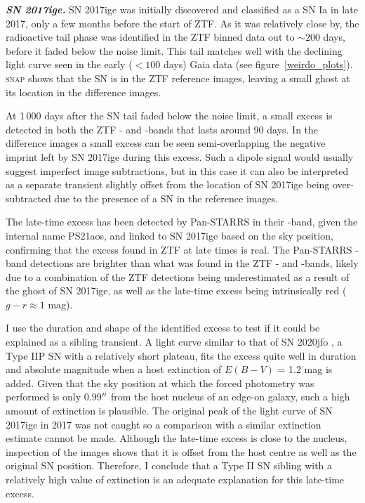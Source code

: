 \documentclass[a4paper,oneside,12pt, class=Latex/Classes/PhDthesisPSnPDF, crop=false]{standalone}
\begin{document}
\textit{\textbf{SN 2017ige.}}
SN 2017ige was initially discovered and classified as a SN Ia in late 2017, only a few months before the start of ZTF. As it was relatively close by, the radioactive tail phase was identified in the ZTF binned data out to $\sim200$ days, before it faded below the noise limit. This tail matches well with the declining light curve seen in the early ($<100$ days) Gaia data (see figure~\ref{weirdo_plots}). \textsc{snap} shows that the SN is in the ZTF reference images, leaving a small ghost at its location in the difference images.

At 1\,000 days after the SN tail faded below the noise limit, a small excess is detected in both the ZTF \ztfg- and \ztfr-bands that lasts around 90 days. In the difference images a small excess can be seen semi-overlapping the negative imprint left by SN 2017ige during this excess. Such a dipole signal would usually suggest imperfect image subtractions, but in this case it can also be interpreted as a separate transient slightly offset from the location of SN 2017ige being over-subtracted due to the presence of a SN in the reference images.

The late-time excess has been detected by Pan-STARRS in their \ztfi-band, given the internal name PS21aos, and linked to SN 2017ige based on the sky position, confirming that the excess found in ZTF at late times is real. The Pan-STARRS \ztfi-band detections are brighter than what was found in the ZTF \ztfg- and \ztfr-bands, likely due to a combination of the ZTF detections being underestimated as a result of the ghost of SN 2017ige, as well as the late-time excess being intrinsically red ($g - r \approx 1$ mag).

I use the duration and shape of the identified excess to test if it could be explained as a sibling transient. A light curve similar to that of SN 2020jfo \citep{Sollerman_2020jfo, IIp_ext}, a Type IIP SN with a relatively short plateau, fits the excess quite well in duration and absolute magnitude when a host extinction of $ E(B - V)$ = 1.2 mag is added. Given that the sky position at which the forced photometry was performed is only 0.99$^{\prime\prime}$ from the host nucleus of an edge-on galaxy, such a high amount of extinction is plausible. The original peak of the light curve of SN 2017ige in 2017 was not caught so a comparison with a similar extinction estimate cannot be made. Although the late-time excess is close to the nucleus, inspection of the images shows that it is offset from the host centre as well as the original SN position. Therefore, I conclude that a Type II SN sibling with a relatively high value of extinction is an adequate explanation for this late-time excess.\\
\end{document}
